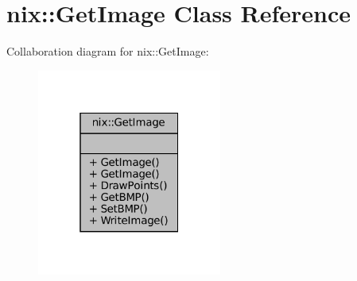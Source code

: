\hypertarget{classnix_1_1GetImage}{}\section{nix\+:\+:Get\+Image Class Reference}
\label{classnix_1_1GetImage}


Collaboration diagram for nix\+:\+:Get\+Image\+:
\nopagebreak
\begin{figure}[H]
\begin{center}
\leavevmode
\includegraphics[width=172pt]{classnix_1_1GetImage__coll__graph}
\end{center}
\end{figure}
